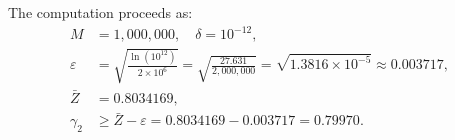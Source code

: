 \documentclass[11pt,a4paper]{article}
\theoremstyle{definition}
\begin{document}
\noindent The computation proceeds as:
\begin{align}
  M &= 1{,}000{,}000, \quad \delta = 10^{-12}, \\
  \varepsilon &= \sqrt{\frac{\ln(10^{12})}{2 \times 10^6}}
  = \sqrt{\frac{27.631}{2{,}000{,}000}}
  = \sqrt{1.3816 \times 10^{-5}}
  \approx 0.003717, \\
  \bar{Z} &= 0.8034169, \\
  \gamma_2 &\geq \bar{Z} - \varepsilon
  = 0.8034169 - 0.003717
  = \mathbf{0.79970}.
\end{align}
\end{document}
